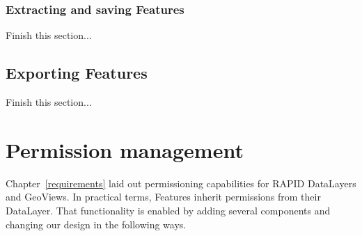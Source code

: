 \subsubsection{Extracting and saving Features}
 Finish this section...

\subsection{Exporting Features}
Finish this section...







\section{Permission management}
Chapter~\ref{requirements} laid out permissioning capabilities for RAPID DataLayers and GeoViews. In practical terms, Features inherit permissions from their DataLayer. That functionality is enabled by adding several components and changing our design in the following ways.

